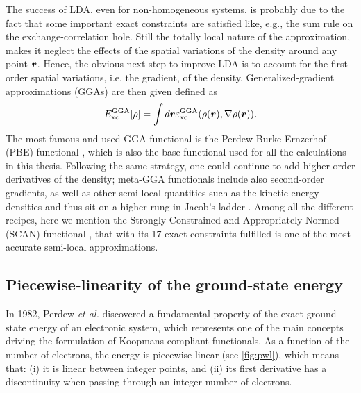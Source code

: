 The success of LDA, even for non-homogeneous systems, is probably due to the fact that some important exact constraints are satisfied like, e.g., the sum rule on the exchange-correlation hole. Still the totally local nature of the approximation, makes it neglect the effects of the spatial variations of the density around any point ${\bm r}$. Hence, the obvious next step to improve LDA is to account for the first-order spatial variations, i.e. the gradient, of the density. Generalized-gradient approximations (GGAs) are then given defined as
%
\begin{equation}
    E^{\rm GGA}_{\rm xc}[\rho] = \int d{\bm r} \varepsilon^{\rm GGA}_{\rm xc}(\rho({\bm r}), \nabla\rho({\bm r})) .
    \label{eq:gga-xc}
\end{equation}
%
The most famous and used GGA functional is the Perdew-Burke-Ernzerhof (PBE) functional \cite{perdew_generalized_1996}, which is also the base functional used for all the calculations in this thesis. Following the same strategy, one could continue to add higher-order derivatives of the density; meta-GGA functionals include also second-order gradients, as well as other semi-local quantities such as the kinetic energy densities and thus sit on a higher rung in Jacob's ladder \cite{perdew_jacobs_2001}. Among all the different recipes, here we mention the Strongly-Constrained and Appropriately-Normed (SCAN) functional \cite{sun_accurate_2016}, that with its 17 exact constraints fulfilled is one of the most accurate semi-local approximations.

\subsection{Piecewise-linearity of the ground-state energy\label{sec:pwl-energy}}
In 1982, Perdew \emph{et al.} \cite{perdew_density-functional_1982} discovered a fundamental property of the exact ground-state energy of an electronic system, which represents one of the main concepts driving the formulation of Koopmans-compliant functionals. As a function of the number of electrons, the energy is piecewise-linear (see \cref{fig:pwl}), which means that: (i) it is linear between integer points, and (ii) its first derivative has a discontinuity when passing through an integer number of electrons.

